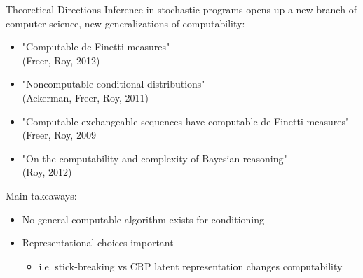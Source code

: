 





\begin{frame}{Theoretical Directions}
  Inference in stochastic programs opens up a new branch of computer science, new generalizations of computability: 
  \begin{itemize}
    \item "Computable de Finetti measures"
	\\ {\color{DarkBlue} (Freer, Roy, 2012)}
	\item "Noncomputable conditional distributions"
	\\ {\color{DarkBlue} (Ackerman, Freer, Roy, 2011)}
	\item "Computable exchangeable sequences have computable de Finetti measures"
	\\ {\color{DarkBlue}(Freer, Roy, 2009}
    \item "On the computability and complexity of Bayesian reasoning"
    \\ {\color{DarkBlue} (Roy, 2012)}
  \end{itemize}
  \vspace{\baselineskip}
  Main takeaways:
  \begin{itemize}
    \item No general computable algorithm exists for conditioning
    \item Representational choices important
    \begin{itemize}
      \item i.e. stick-breaking vs CRP latent representation changes computability
    \end{itemize}
  \end{itemize}
  
\end{frame}


